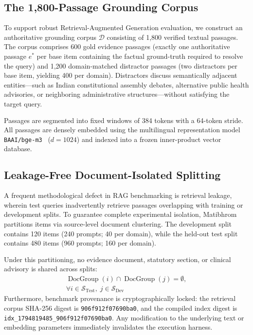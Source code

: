 \documentclass[11pt,a4paper,twocolumn]{article}
\begin{document}
\subsection{The 1,800-Passage Grounding Corpus}
To support robust Retrieval-Augmented Generation evaluation, we construct an authoritative grounding corpus $\mathcal{D}$ consisting of 1,800 verified textual passages. The corpus comprises 600 gold evidence passages (exactly one authoritative passage $e^*$ per base item containing the factual ground-truth required to resolve the query) and 1,200 domain-matched distractor passages (two distractors per base item, yielding 400 per domain). Distractors discuss semantically adjacent entities---such as Indian constitutional assembly debates, alternative public health advisories, or neighboring administrative structures---without satisfying the target query.

Passages are segmented into fixed windows of 384 tokens with a 64-token stride. All passages are densely embedded using the multilingual representation model \texttt{BAAI/bge-m3}~\citep{chen2024bge} ($d = 1024$) and indexed into a frozen inner-product vector database.

\subsection{Leakage-Free Document-Isolated Splitting}
A frequent methodological defect in RAG benchmarking is retrieval leakage, wherein test queries inadvertently retrieve passages overlapping with training or development splits. To guarantee complete experimental isolation, Matibhrom partitions items via source-level document clustering. The development split contains 120 items (240 prompts; 40 per domain), while the held-out test split contains 480 items (960 prompts; 160 per domain). 

Under this partitioning, no evidence document, statutory section, or clinical advisory is shared across splits:
\begin{equation}
\begin{split}
    \operatorname{DocGroup}(i) \cap \operatorname{DocGroup}(j) = \emptyset, \\
    \forall i \in \mathcal{S}_{\text{Test}}, \; j \in \mathcal{S}_{\text{Dev}}
\end{split}
\label{eq:document_isolation}
\end{equation}
Furthermore, benchmark provenance is cryptographically locked: the retrieval corpus SHA-256 digest is \texttt{906f912f07690ba0}, and the compiled index digest is \texttt{idx\_1794819485\_906f912f07690ba0}. Any modification to the underlying text or embedding parameters immediately invalidates the execution harness.
\end{document}
